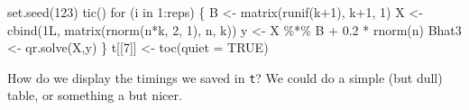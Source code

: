 \documentclass[
  letterpaper,
]{book}
\newenvironment{Shaded}{\begin{snugshade}}{\end{snugshade}}
\newcommand{\AttributeTok}[1]{\textcolor[rgb]{0.40,0.45,0.13}{#1}}
\newcommand{\ConstantTok}[1]{\textcolor[rgb]{0.56,0.35,0.01}{#1}}
\newcommand{\ControlFlowTok}[1]{\textcolor[rgb]{0.00,0.23,0.31}{#1}}
\newcommand{\DecValTok}[1]{\textcolor[rgb]{0.68,0.00,0.00}{#1}}
\newcommand{\FloatTok}[1]{\textcolor[rgb]{0.68,0.00,0.00}{#1}}
\newcommand{\FunctionTok}[1]{\textcolor[rgb]{0.28,0.35,0.67}{#1}}
\newcommand{\NormalTok}[1]{\textcolor[rgb]{0.00,0.23,0.31}{#1}}
\newcommand{\OtherTok}[1]{\textcolor[rgb]{0.00,0.23,0.31}{#1}}
\newcommand{\SpecialCharTok}[1]{\textcolor[rgb]{0.37,0.37,0.37}{#1}}
\begin{document}
\begin{Shaded}
\begin{Highlighting}[]
\FunctionTok{set.seed}\NormalTok{(}\DecValTok{123}\NormalTok{)}
\FunctionTok{tic}\NormalTok{()}
\ControlFlowTok{for}\NormalTok{ (i }\ControlFlowTok{in} \DecValTok{1}\SpecialCharTok{:}\NormalTok{reps) \{ }
\NormalTok{  B }\OtherTok{\textless{}{-}} \FunctionTok{matrix}\NormalTok{(}\FunctionTok{runif}\NormalTok{(k}\SpecialCharTok{+}\DecValTok{1}\NormalTok{), k}\SpecialCharTok{+}\DecValTok{1}\NormalTok{, }\DecValTok{1}\NormalTok{)}
\NormalTok{  X }\OtherTok{\textless{}{-}} \FunctionTok{cbind}\NormalTok{(1L, }\FunctionTok{matrix}\NormalTok{(}\FunctionTok{rnorm}\NormalTok{(n}\SpecialCharTok{*}\NormalTok{k, }\DecValTok{2}\NormalTok{, }\DecValTok{1}\NormalTok{), n, k))}
\NormalTok{  y }\OtherTok{\textless{}{-}}\NormalTok{ X }\SpecialCharTok{\%*\%}\NormalTok{ B }\SpecialCharTok{+} \FloatTok{0.2} \SpecialCharTok{*} \FunctionTok{rnorm}\NormalTok{(n) }
\NormalTok{  Bhat3 }\OtherTok{\textless{}{-}} \FunctionTok{qr.solve}\NormalTok{(X,y) }
\NormalTok{  \}}
\NormalTok{t[[}\DecValTok{7}\NormalTok{]] }\OtherTok{\textless{}{-}} \FunctionTok{toc}\NormalTok{(}\AttributeTok{quiet =} \ConstantTok{TRUE}\NormalTok{)}
\end{Highlighting}
\end{Shaded}

How do we display the timings we saved in \texttt{t}? We could do a
simple (but dull) table, or something a but nicer.
\end{document}
